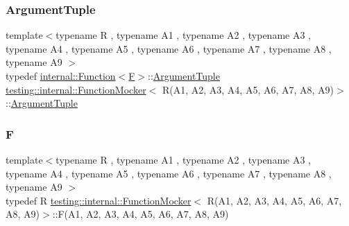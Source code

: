 \subsubsection{\texorpdfstring{ArgumentTuple}{ArgumentTuple}}
{\footnotesize\ttfamily template$<$typename R , typename A1 , typename A2 , typename A3 , typename A4 , typename A5 , typename A6 , typename A7 , typename A8 , typename A9 $>$ \\
typedef \mbox{\hyperlink{structtesting_1_1internal_1_1Function}{internal\+::\+Function}}$<$\mbox{\hyperlink{classtesting_1_1internal_1_1FunctionMocker_3_01R_07A1_00_01A2_00_01A3_00_01A4_00_01A5_00_01A6_00_01A7_00_01A8_00_01A9_08_4_a8de64ec5559bd4e4410a4374e9c93e4e}{F}}$>$\+::\mbox{\hyperlink{classtesting_1_1internal_1_1FunctionMocker_3_01R_07A1_00_01A2_00_01A3_00_01A4_00_01A5_00_01A6_00_01A7_00_01A8_00_01A9_08_4_afcb802dfc6e26a318bd0599846bff218}{Argument\+Tuple}} \mbox{\hyperlink{classtesting_1_1internal_1_1FunctionMocker}{testing\+::internal\+::\+Function\+Mocker}}$<$ R(A1, A2, A3, A4, A5, A6, A7, A8, A9)$>$\+::\mbox{\hyperlink{classtesting_1_1internal_1_1FunctionMocker_3_01R_07A1_00_01A2_00_01A3_00_01A4_00_01A5_00_01A6_00_01A7_00_01A8_00_01A9_08_4_afcb802dfc6e26a318bd0599846bff218}{Argument\+Tuple}}}

\mbox{\label{classtesting_1_1internal_1_1FunctionMocker_3_01R_07A1_00_01A2_00_01A3_00_01A4_00_01A5_00_01A6_00_01A7_00_01A8_00_01A9_08_4_a8de64ec5559bd4e4410a4374e9c93e4e}} 
\subsubsection{\texorpdfstring{F}{F}}
{\footnotesize\ttfamily template$<$typename R , typename A1 , typename A2 , typename A3 , typename A4 , typename A5 , typename A6 , typename A7 , typename A8 , typename A9 $>$ \\
typedef R \mbox{\hyperlink{classtesting_1_1internal_1_1FunctionMocker}{testing\+::internal\+::\+Function\+Mocker}}$<$ R(A1, A2, A3, A4, A5, A6, A7, A8, A9)$>$\+::F(A1, A2, A3, A4, A5, A6, A7, A8, A9)}



